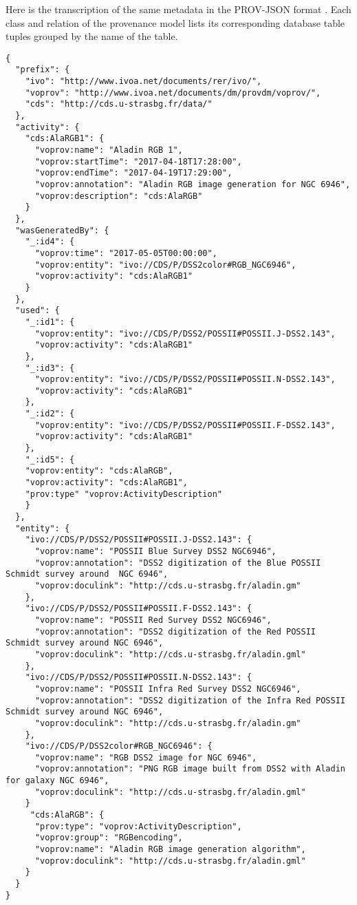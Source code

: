 Here is the transcription of the same metadata in the PROV-JSON format \citep{std:PROV-JSON}. 
Each class and relation of the provenance model lists its corresponding database table tuples grouped by the name of the table.

\begin{verbatim}
{
  "prefix": {
    "ivo": "http://www.ivoa.net/documents/rer/ivo/",
    "voprov": "http://www.ivoa.net/documents/dm/provdm/voprov/",
    "cds": "http://cds.u-strasbg.fr/data/"
  },
  "activity": {
    "cds:AlaRGB1": {
      "voprov:name": "Aladin RGB 1",
      "voprov:startTime": "2017-04-18T17:28:00",
      "voprov:endTime": "2017-04-19T17:29:00",
      "voprov:annotation": "Aladin RGB image generation for NGC 6946",
      "voprov:description": "cds:AlaRGB"
    }
  },
  "wasGeneratedBy": {
    "_:id4": {
      "voprov:time": "2017-05-05T00:00:00",
      "voprov:entity": "ivo://CDS/P/DSS2color#RGB_NGC6946",
      "voprov:activity": "cds:AlaRGB1"
    }
  },
  "used": {
    "_:id1": {
      "voprov:entity": "ivo://CDS/P/DSS2/POSSII#POSSII.J-DSS2.143",
      "voprov:activity": "cds:AlaRGB1"
    },
    "_:id3": {
      "voprov:entity": "ivo://CDS/P/DSS2/POSSII#POSSII.N-DSS2.143",
      "voprov:activity": "cds:AlaRGB1"
    },
    "_:id2": {
      "voprov:entity": "ivo://CDS/P/DSS2/POSSII#POSSII.F-DSS2.143",
      "voprov:activity": "cds:AlaRGB1"
    },
    "_:id5": {
    "voprov:entity": "cds:AlaRGB",
    "voprov:activity": "cds:AlaRGB1",
    "prov:type" "voprov:ActivityDescription" 
    }
  },
  "entity": {
    "ivo://CDS/P/DSS2/POSSII#POSSII.J-DSS2.143": {
      "voprov:name": "POSSII Blue Survey DSS2 NGC6946",
      "voprov:annotation": "DSS2 digitization of the Blue POSSII Schmidt survey around  NGC 6946",
      "voprov:doculink": "http://cds.u-strasbg.fr/aladin.gm"
    },
    "ivo://CDS/P/DSS2/POSSII#POSSII.F-DSS2.143": {
      "voprov:name": "POSSII Red Survey DSS2 NGC6946",
      "voprov:annotation": "DSS2 digitization of the Red POSSII Schmidt survey around NGC 6946",
      "voprov:doculink": "http://cds.u-strasbg.fr/aladin.gml"
    },
    "ivo://CDS/P/DSS2/POSSII#POSSII.N-DSS2.143": {
      "voprov:name": "POSSII Infra Red Survey DSS2 NGC6946",
      "voprov:annotation": "DSS2 digitization of the Infra Red POSSII Schmidt survey around NGC 6946",
      "voprov:doculink": "http://cds.u-strasbg.fr/aladin.gm"
    },
    "ivo://CDS/P/DSS2color#RGB_NGC6946": {
      "voprov:name": "RGB DSS2 image for NGC 6946",
      "voprov:annotation": "PNG RGB image built from DSS2 with Aladin for galaxy NGC 6946",
      "voprov:doculink": "http://cds.u-strasbg.fr/aladin.gml"
    }
     "cds:AlaRGB": {
      "prov:type": "voprov:ActivityDescription",
      "voprov:group": "RGBencoding",
      "voprov:name": "Aladin RGB image generation algorithm",
      "voprov:doculink": "http://cds.u-strasbg.fr/aladin.gml"
    }
  }
}
\end{verbatim}

